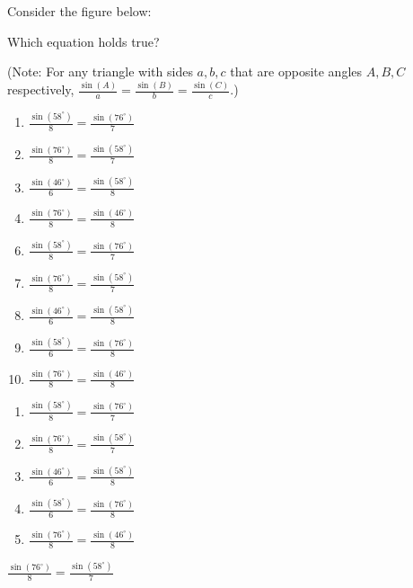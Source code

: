 
 Consider the figure below:
\begin{center}
\end{center}


Which equation holds true?

(Note: For any triangle with sides $a,b,c$ that are opposite angles $A,B,C$ respectively, $\frac{\sin(A)}{a}=\frac{\sin(B)}{b}=\frac{\sin(C)}{c}.$)


\ifsat
	\begin{enumerate}[label=\Alph*)]
		\item    $\frac{\sin(58^\circ)}{8}=\frac{\sin(76^\circ)}{7}$
		\item  $\frac{\sin(76^\circ)}{8}=\frac{\sin(58^\circ)}{7}$ %
		\item $\frac{\sin(46^\circ)}{6}=\frac{\sin(58^\circ)}{8}$
		\item  $\frac{\sin(76^\circ)}{8}=\frac{\sin(46^\circ)}{8}$
	\end{enumerate}
\else
\fi

\ifacteven
	\begin{enumerate}[label=\textbf{\Alph*.},itemsep=\fill,align=left]
		\setcounter{enumii}{5}
		\item    $\frac{\sin(58^\circ)}{8}=\frac{\sin(76^\circ)}{7}$
		\item  $\frac{\sin(76^\circ)}{8}=\frac{\sin(58^\circ)}{7}$ %
		\item $\frac{\sin(46^\circ)}{6}=\frac{\sin(58^\circ)}{8}$
		\addtocounter{enumii}{1}
		\item $\frac{\sin(58^\circ)}{6}=\frac{\sin(76^\circ)}{8}$
		\item  $\frac{\sin(76^\circ)}{8}=\frac{\sin(46^\circ)}{8}$
	\end{enumerate}
\else
\fi

\ifactodd
	\begin{enumerate}[label=\textbf{\Alph*.},itemsep=\fill,align=left]
		\item    $\frac{\sin(58^\circ)}{8}=\frac{\sin(76^\circ)}{7}$
		\item  $\frac{\sin(76^\circ)}{8}=\frac{\sin(58^\circ)}{7}$ %
		\item $\frac{\sin(46^\circ)}{6}=\frac{\sin(58^\circ)}{8}$
		\item $\frac{\sin(58^\circ)}{6}=\frac{\sin(76^\circ)}{8}$
		\item  $\frac{\sin(76^\circ)}{8}=\frac{\sin(46^\circ)}{8}$
	\end{enumerate}
\else
\fi

\ifgridin
  $\frac{\sin(76^\circ)}{8}=\frac{\sin(58^\circ)}{7}$ %
		
\else
\fi

